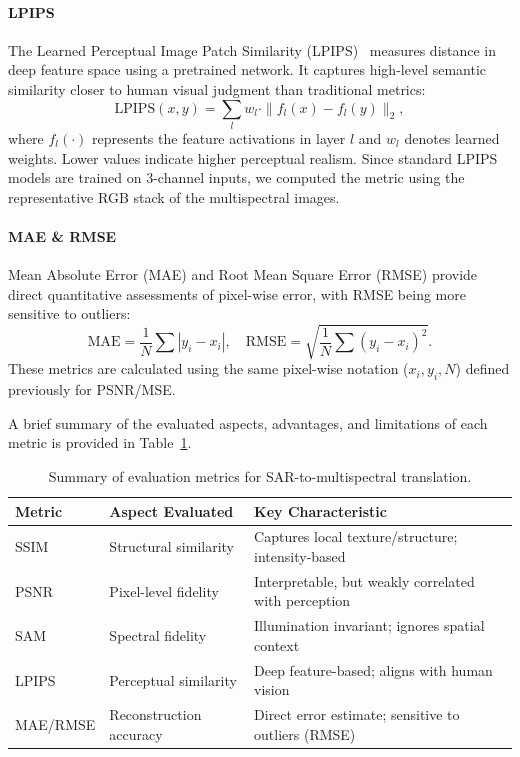 \documentclass[remotesensing,article,submit,pdftex,moreauthors]{Definitions/mdpi}
\begin{document}
\paragraph{\textbf{LPIPS}} 
The Learned Perceptual Image Patch Similarity (LPIPS)~\cite{iqa_lpips} measures distance in deep feature space using a pretrained network. It captures high-level semantic similarity closer to human visual judgment than traditional metrics:
\begin{equation}
\text{LPIPS}(x,y) = \sum_{l} w_l \cdot \| f_l(x) - f_l(y) \|_2,
\end{equation}
where $f_l(\cdot)$ represents the feature activations in layer $l$ and $w_l$ denotes learned weights. Lower values indicate higher perceptual realism. Since standard LPIPS models are trained on 3-channel inputs, we computed the metric using the representative RGB stack of the multispectral images.

\paragraph{\textbf{MAE \& RMSE}} Mean Absolute Error (MAE) and Root Mean Square Error (RMSE) provide direct quantitative assessments of pixel-wise error, with RMSE being more sensitive to outliers:
\begin{equation}
\mathrm{MAE} = \frac{1}{N} \sum |y_i - x_i|, \quad \mathrm{RMSE} = \sqrt{\frac{1}{N} \sum (y_i - x_i)^2}.
\end{equation}
These metrics are calculated using the same pixel-wise notation ($x_i, y_i, N$) defined previously for PSNR/MSE.

A brief summary of the evaluated aspects, advantages, and limitations of each metric is provided in Table~\ref{tab:evaluation_metrics}.

\begin{table}[!htbp]
    \centering
    \caption{Summary of evaluation metrics for SAR-to-multispectral translation.}
    \label{tab:evaluation_metrics}
    \small
    \begin{tabularx}{\textwidth}{l X l}
        \toprule
        \textbf{Metric} & \textbf{Aspect Evaluated} & \textbf{Key Characteristic} \\
        \midrule
        SSIM  & Structural similarity & Captures local texture/structure; intensity-based \\
        PSNR  & Pixel-level fidelity & Interpretable, but weakly correlated with perception \\
        SAM   & Spectral fidelity & Illumination invariant; ignores spatial context \\
        LPIPS & Perceptual similarity & Deep feature-based; aligns with human vision \\ 
        MAE/RMSE & Reconstruction accuracy & Direct error estimate; sensitive to outliers (RMSE) \\
        \bottomrule
    \end{tabularx}
\end{table}
% 
\end{document}
